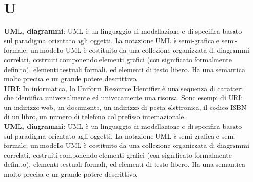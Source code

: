 \section*{U}
\textbf{UML, diagrammi}: UML è un linguaggio di modellazione e di specifica basato sul paradigma orientato agli oggetti.
 La notazione UML è semi-grafica e semi-formale; un modello UML è costituito da una collezione organizzata di diagrammi correlati, costruiti componendo elementi grafici (con significato
formalmente definito), elementi testuali formali, ed elementi di testo libero. Ha una semantica molto
precisa e un grande potere descrittivo.\\
\textbf{URI}: In informatica, lo Uniform Resource Identifier è una sequenza di caratteri che identifica universalmente ed univocamente una risorsa. Sono esempi di URI: un indirizzo web, un documento, un indirizzo di posta elettronica, il codice ISBN di un libro, un numero di telefono col prefisso internazionale.\\
 \textbf{UML, diagrammi}: UML è un linguaggio di modellazione e di specifica basato sul paradigma orientato agli oggetti.
La notazione UML è semi-grafica e semi-formale; un modello UML è costituito da una collezione organizzata di diagrammi correlati, costruiti componendo elementi grafici (con significato
formalmente definito), elementi testuali formali, ed elementi di testo libero. Ha una semantica molto
precisa e un grande potere descrittivo.\\
